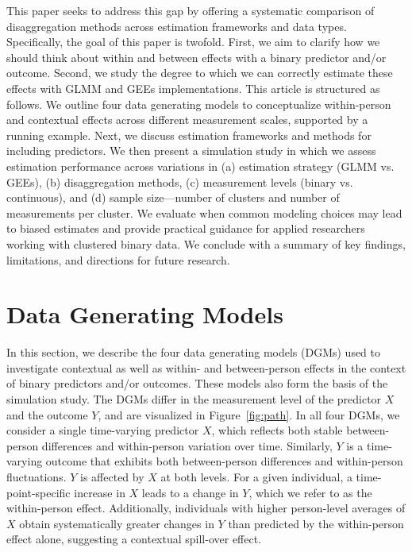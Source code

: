 \documentclass[stu]{apa7}
\begin{document}
This paper seeks to address this gap by offering a systematic comparison of disaggregation methods across estimation frameworks and data types. Specifically, the goal of this paper is twofold. First, we aim to clarify how we should think about within and between effects with a binary predictor and/or outcome. Second, we study the degree to which we can correctly estimate these effects with GLMM and GEEs implementations. This article is structured as follows. We outline four data generating models to conceptualize within-person and contextual effects across different measurement scales, supported by a running example. Next, we discuss estimation frameworks and methods for including predictors. We then present a simulation study in which we assess estimation performance across variations in (a) estimation strategy (GLMM vs. GEEs), (b) disaggregation methods, (c) measurement levels (binary vs. continuous), and (d) sample size---number of clusters and number of measurements per cluster. We evaluate when common modeling choices may lead to biased estimates and provide practical guidance for applied researchers working with clustered binary data. We conclude with a summary of key findings, limitations, and directions for future research. 

\section{Data Generating Models}

In this section, we describe the four data generating models (DGMs) used to investigate contextual as well as within- and between-person effects in the context of binary predictors and/or outcomes. These models also form the basis of the simulation study. The DGMs differ in the measurement level of the predictor $X$ and the outcome $Y$, and are visualized in Figure~\ref{fig:path}. In all four DGMs, we consider a single time-varying predictor $X$, which reflects both stable between-person differences and within-person variation over time. Similarly, $Y$ is a time-varying outcome that exhibits both between-person differences and within-person fluctuations. $Y$ is affected by $X$ at both levels. For a given individual, a time-point-specific increase in \( X \) leads to a change in \( Y \), which we refer to as the within-person effect. Additionally, individuals with higher person-level averages of \( X \) obtain systematically greater changes in \( Y \) than predicted by the within-person effect alone, suggesting a contextual spill-over effect.
\end{document}
